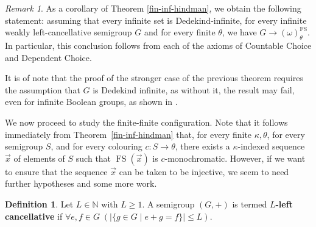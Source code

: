 \documentclass{amsart}
\theoremstyle{definition}
\newtheorem{definition}[theorem]{Definition}
\theoremstyle{remark}
\newtheorem{remark}[theorem]{Remark}
\numberwithin{equation}{section}
\begin{document}
\begin{remark}
    As a corollary of Theorem \ref{fin-inf-hindman}, we obtain the following statement: assuming that every infinite set is Dedekind-infinite, for every infinite weakly left-cancellative semigroup $G$ and for every finite $\theta$, we have $G \to (\omega)_\theta^{\operatorname{FS}}$. In particular, this conclusion follows from each of the axioms of Countable Choice and Dependent Choice.
\end{remark}

It is of note that the proof of the stronger case of the previous theorem requires the assumption that $G$ is Dedekind infinite, as without it, the result may fail, even for infinite Boolean groups, as shown in \cite[Theorem 5.2]{Fernandez2024}.

We now proceed to study the finite-finite configuration. Note that it follows immediately from Theorem~\ref{fin-inf-hindman} that, for every finite $\kappa,\theta$, for every semigroup $S$, and for every colouring $c:S\longrightarrow\theta$, there exists a $\kappa$-indexed sequence $\vec{x}$ of elements of $S$ such that $\operatorname{FS}(\vec{x})$ is $c$-monochromatic. However, if we want to ensure that the sequence $\vec{x}$ can be taken to be injective, we seem to need further hypotheses and some more work.

\begin{definition}
    Let $L\in\mathbb{N}$ with $L\geq1$. A semigroup $(G, +)$ is termed \textbf{$L$-left cancellative} if $\forall e, f\in G\;(|\{g\in G\mid e+g=f\}|\leq L)$.
\end{definition}
\end{document}
